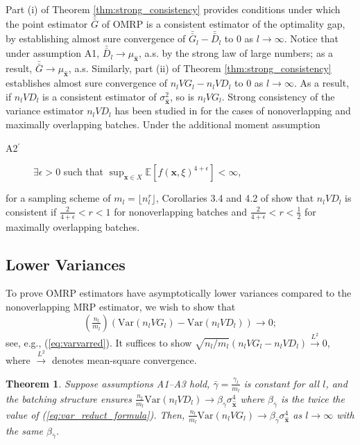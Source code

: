 \documentclass[12pt]{article}
\newtheorem{theorem}{Theorem}
\newcommand{\e}[1]{\mathbb{E} \left[ #1 \right]
}
\newcommand{\var}[1]{\mathrm{Var} \left( #1 \right)}
\newcommand{\x}{\mathbf{x}}
\newcommand{\xh}{{\hat{\x}}}
\newcommand{\gammab}{\bar{\gamma}}
\newcommand{\gb}{\bar{G}}
\newcommand{\gbb}{\bar{\gb}}
\newcommand{\db}{\bar{D}}
\newcommand{\dbb}{\bar{\db}}
\begin{document}
Part (i) of Theorem \ref{thm:strong_consistency} provides conditions under which the point estimator $\gbb$ of OMRP is a consistent estimator of the optimality gap, by establishing almost sure convergence of $\gbb_l - \dbb_l$ to $0$ as $l \rightarrow \infty$. 
Notice that under assumption A1, $\dbb_l \rightarrow \mu_\xh$, a.s. by the strong law of large numbers; as a result, $\gbb \rightarrow \mu_\xh$, a.s. 
Similarly, part (ii) of Theorem \ref{thm:strong_consistency} establishes almost sure convergence of $n_l VG_l - n_l VD_l$ to $0$ as $l \rightarrow \infty$. 
As a result, if $n_l VD_l$ is a consistent estimator of $\sigma^2_{\xh}$, so is $n_l VG_l$.  
Strong consistency of the variance estimator $n_l VD_l$ has been studied in \citep{damerdji1994strong} for the cases of nonoverlapping and maximally overlapping batches.  
Under the additional moment assumption
\begin{description}
	\item[A2$^\prime$]  $\exists \epsilon > 0$ such that $\sup_{\x \in X} \e{f(\x,\xi)^{4+\epsilon}} < \infty$,
\end{description}
for a sampling scheme of $m_l = \lfloor n_l^r \rfloor$, Corollaries 3.4 and 4.2 of \citep{damerdji1994strong} show that $n_l VD_l$ is consistent if $\tfrac{2}{4+\epsilon} < r < 1$ for nonoverlapping batches and $\tfrac{2}{4+\epsilon} < r < \tfrac{1}{2}$ for maximally overlapping batches. 


\subsection{Lower Variances}
\label{ssec:var_reduct}

 
To prove OMRP estimators have asymptotically lower variances compared to the nonoverlapping MRP estimator, we wish to show that 
$$
(\tfrac{n_l}{m_l}) \left( \var{n_l VG_l} - \var{n_l VD_l} \right) \rightarrow 0;
$$
see, e.g., (\ref{eq:varvarred}).
It suffices to show $\sqrt{{n_l}/{m_l}} \left( n_l VG_l - n_l VD_l \right) \xrightarrow{L^2} 0$, where $\xrightarrow{L^2}$ denotes mean-square convergence.


\begin{theorem} \label{thm:varvar_conv}
	Suppose assumptions A1--A3 hold, $\gammab = \frac{\gamma_l}{m_l}$ is constant for all $l$, and the batching structure ensures  $\frac{n_l}{m_l}\var{n_l VD_l} \rightarrow \beta_{\gammab} \sigma^4_{\xh}$ where $\beta_{\gammab}$ is the twice the value of (\ref{eq:var_reduct_formula}). 
        Then, $\frac{n_l}{m_l}\var{n_l VG_l} \rightarrow \beta_{\gammab} \sigma^4_{\xh}$ as $l \rightarrow \infty$ with the same $\beta_{\gammab}$. 
\end{theorem}
\end{document}
